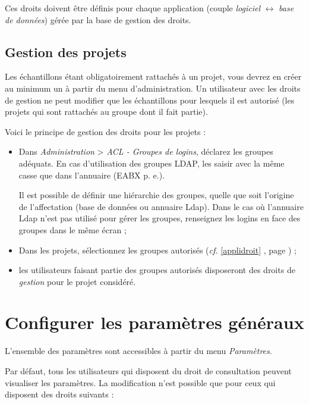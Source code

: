 Ces droits doivent être définis pour chaque application (couple \textit{logiciel} $\leftrightarrow$ \textit{base de données}) gérée par la base de gestion des droits.

\subsection{Gestion des projets}
\label{projet}

Les échantillons étant obligatoirement rattachés à un projet, vous devrez en créer au minimum un à partir du menu d'administration. Un utilisateur avec les droits de gestion ne peut modifier que les échantillons pour lesquels il est autorisé (les projets qui sont rattachés au groupe dont il fait partie).

Voici le principe de gestion des droits pour les projets :
\begin{itemize}
\item Dans \textit{Administration} > \textit{ACL - Groupes de logins}, déclarez les groupes adéquats. En cas d'utilisation des groupes LDAP, les saisir avec la même casse que dans l'annuaire (EABX p. e.).

Il est possible de définir une hiérarchie des groupes, quelle que soit l'origine de l'affectation (base de données ou annuaire Ldap).
Dans le cas où l'annuaire Ldap n'est pas utilisé pour gérer les groupes, renseignez les logins en face des groupes dans le même écran ;
\item Dans les projets, sélectionnez les groupes autorisés (\textit{cf.} \ref{applidroit} \textit{}, page \pageref{applidroit}) ;
\item les utilisateurs faisant partie des groupes autorisés disposeront des droits de \textit{gestion} pour le projet considéré.
\end{itemize}

\section{Configurer les paramètres généraux}
\label{param}
L'ensemble des paramètres sont accessibles à partir du menu \textit{Paramètres}. 

Par défaut, tous les utilisateurs qui disposent du droit de consultation peuvent visualiser les paramètres. La modification n'est possible que pour ceux qui disposent des droits suivants :

